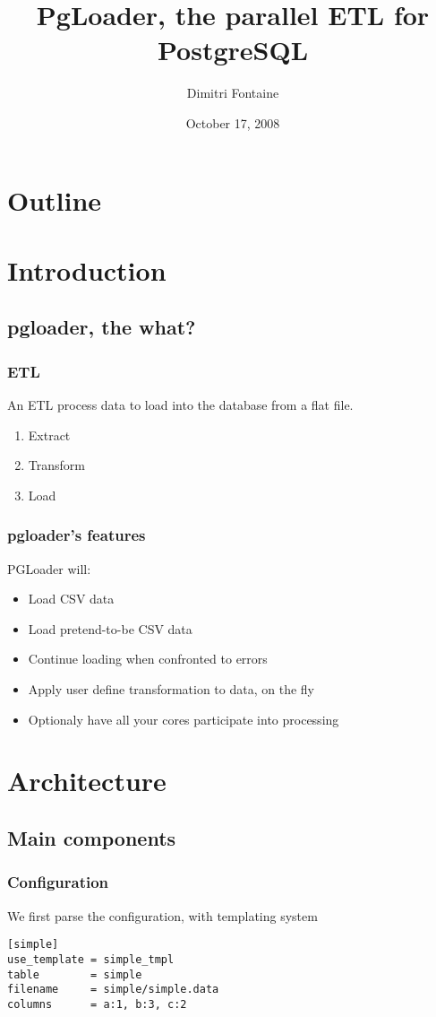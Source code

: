 \documentclass{beamer}
\title{PgLoader, the parallel ETL for PostgreSQL}
\author{Dimitri Fontaine}
\date{October 17, 2008}
\begin{document}
\frame{\titlepage}

\section*{Outline}

\section{Introduction}
\subsection{pgloader, the what?}

\frame
{
  \frametitle{ETL}

  \begin{definition}
    An \alert{ETL} process data to load into the database from a flat
    file.
  \end{definition}

  \begin{enumerate}
   \item Extract
   \item Transform
   \item Load
  \end{enumerate}
}

\frame
{
  \frametitle{pgloader's features}

  PGLoader will:

  \begin{itemize}
   \item<1-> Load CSV data
   \item<2-> Load pretend-to-be CSV data
   \item<3-> Continue loading when confronted to errors
   \item<4-> Apply user define transformation to data, on the fly
   \item<5-> Optionaly have all your cores participate into processing
  \end{itemize}
}

\section{Architecture}
\subsection{Main components}

\begin{frame}[fragile]
  \frametitle{Configuration}

  We first parse the configuration, with templating system

  \begin{example}
  \begin{verbatim}
[simple]
use_template = simple_tmpl
table        = simple
filename     = simple/simple.data
columns      = a:1, b:3, c:2
  \end{verbatim}
  \end{example}  
\end{frame}
\end{document}
